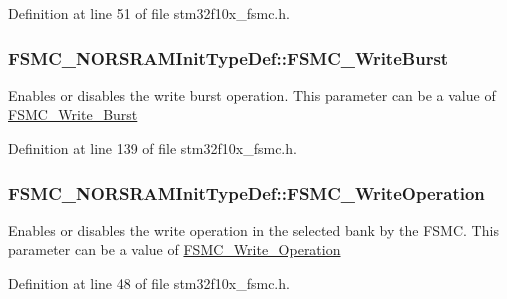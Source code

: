 Definition at line 51 of file stm32f10x\+\_\+fsmc.\+h.

\subsubsection[{\texorpdfstring{F\+S\+M\+C\+\_\+\+Write\+Burst}{FSMC_WriteBurst}}]{ F\+S\+M\+C\+\_\+\+N\+O\+R\+S\+R\+A\+M\+Init\+Type\+Def\+::\+F\+S\+M\+C\+\_\+\+Write\+Burst}\hypertarget{struct_f_s_m_c___n_o_r_s_r_a_m_init_type_def_adac3756711f2d76e56a8cbcb7a03843d}{}\label{struct_f_s_m_c___n_o_r_s_r_a_m_init_type_def_adac3756711f2d76e56a8cbcb7a03843d}
Enables or disables the write burst operation. This parameter can be a value of \hyperlink{group___f_s_m_c___write___burst}{F\+S\+M\+C\+\_\+\+Write\+\_\+\+Burst} 

Definition at line 139 of file stm32f10x\+\_\+fsmc.\+h.

\subsubsection[{\texorpdfstring{F\+S\+M\+C\+\_\+\+Write\+Operation}{FSMC_WriteOperation}}]{ F\+S\+M\+C\+\_\+\+N\+O\+R\+S\+R\+A\+M\+Init\+Type\+Def\+::\+F\+S\+M\+C\+\_\+\+Write\+Operation}\hypertarget{struct_f_s_m_c___n_o_r_s_r_a_m_init_type_def_a932ab31ad95f39b544ad32af0512f811}{}\label{struct_f_s_m_c___n_o_r_s_r_a_m_init_type_def_a932ab31ad95f39b544ad32af0512f811}
Enables or disables the write operation in the selected bank by the F\+S\+MC. This parameter can be a value of \hyperlink{group___f_s_m_c___write___operation}{F\+S\+M\+C\+\_\+\+Write\+\_\+\+Operation} 

Definition at line 48 of file stm32f10x\+\_\+fsmc.\+h.

